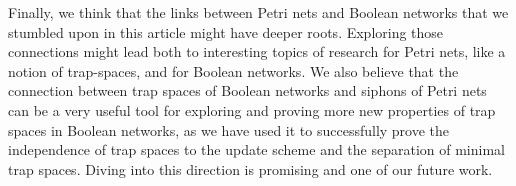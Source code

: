 \documentclass[preprint,12pt]{elsarticle}
\begin{document}
Finally, we think that the links between Petri nets and Boolean networks that we stumbled upon in this article might have deeper roots.
Exploring those connections might lead both to interesting topics of research for Petri nets, like a notion of trap-spaces, and for Boolean networks.
We also believe that the connection between trap spaces of Boolean networks and siphons of Petri nets can be a very useful tool for exploring and proving more new properties of trap spaces in Boolean networks, as we have used it to successfully prove the independence of trap spaces to the update scheme and the separation of minimal trap spaces.
Diving into this direction is promising and one of our future work.




\end{document}
